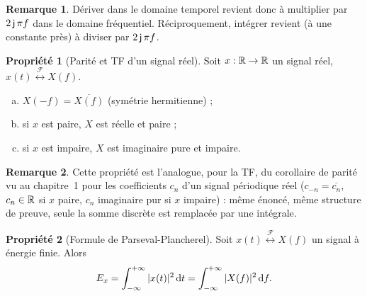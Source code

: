 \documentclass[a4paper,11pt]{article}
\theoremstyle{definition}
\newtheorem{proposition}{Propriété}[section]
\newtheorem{remark}{Remarque}[section]
\newcommand{\tf}{\overset{\mathcal F}{\longleftrightarrow}}
\begin{document}
\begin{remark}
    Dériver dans le domaine temporel revient donc à multiplier par $2\operatorname{\mathsf{j}}\pi f$ dans le domaine fréquentiel. Réciproquement, intégrer revient (à une constante près) à diviser par $2\operatorname{\mathsf{j}}\pi f$.
\end{remark}

\begin{proposition}[Parité et TF d'un signal réel]
    \label{prop:parite}
    Soit $x:{\mathbb{R}}\to{\mathbb{R}}$ un signal réel, $x(t)\tf X(f)$.
    \begin{enumerate}[a)]
        \item $X(-f) = \overline{X(f)}$ (symétrie hermitienne) ;
        \item si $x$ est paire, $X$ est réelle et paire ;
        \item si $x$ est impaire, $X$ est imaginaire pure et impaire.
    \end{enumerate}
\end{proposition}




\begin{remark}
    Cette propriété est l'analogue, pour la TF, du corollaire de parité vu au chapitre~1 pour les coefficients $c_n$ d'un signal périodique réel ($c_{-n}=\overline{c_n}$, $c_n\in{\mathbb{R}}$ si $x$ paire, $c_n$ imaginaire pur si $x$ impaire) : même énoncé, même structure de preuve, seule la somme discrète est remplacée par une intégrale.
\end{remark}

\begin{proposition}[Formule de Parseval-Plancherel]
    \label{prop:parseval-tf}
    Soit $x(t)\tf X(f)$ un signal à énergie finie. Alors
    $$
        E_x = \int_{-\infty}^{+\infty} |x(t)|^2\,{\rm d} t = \int_{-\infty}^{+\infty} |X(f)|^2\,{\rm d} f.
    $$
\end{proposition}
\end{document}
